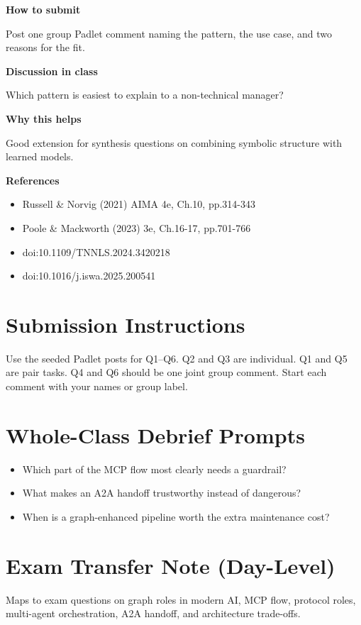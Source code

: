 \documentclass[11pt]{article}
\providecommand{\tightlist}{\setlength{\itemsep}{0pt}\setlength{\parskip}{0pt}}
\begin{document}
\begin{tcolorbox}[colback=white,colframe=MidnightBlue,title={Q6 Stretch Extension},fonttitle=\bfseries,breakable]
{\large\bfseries\color{MidnightBlue} How to submit}\par\medskip
Post one group Padlet comment naming the pattern, the use case, and two reasons for the fit.

{\large\bfseries\color{MidnightBlue} Discussion in class}\par\medskip
Which pattern is easiest to explain to a non-technical manager?

{\large\bfseries\color{MidnightBlue} Why this helps}\par\medskip
Good extension for synthesis questions on combining symbolic structure with learned models.

{\large\bfseries\color{MidnightBlue} References}\par\medskip
\begin{itemize}\item Russell \& Norvig (2021) AIMA 4e, Ch.10, pp.314-343
\item Poole \& Mackworth (2023) 3e, Ch.16-17, pp.701-766
\item doi:10.1109/TNNLS.2024.3420218
\item doi:10.1016/j.iswa.2025.200541\end{itemize}
\end{tcolorbox}

\section*{Submission Instructions}

Use the seeded Padlet posts for Q1--Q6. Q2 and Q3 are individual. Q1 and Q5 are pair tasks. Q4 and Q6 should be one joint group comment. Start each comment with your names or group label.

\section*{Whole-Class Debrief Prompts}

\begin{itemize}
\tightlist
\item
  Which part of the MCP flow most clearly needs a guardrail?
\item
  What makes an A2A handoff trustworthy instead of dangerous?
\item
  When is a graph-enhanced pipeline worth the extra maintenance cost?
\end{itemize}

\section*{Exam Transfer Note (Day-Level)}

Maps to exam questions on graph roles in modern AI, MCP flow, protocol roles, multi-agent orchestration, A2A handoff, and architecture trade-offs.
\end{document}
